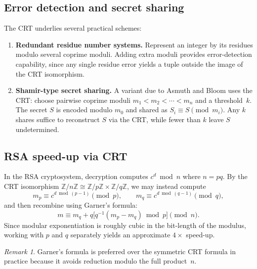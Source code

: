 \documentclass[12pt,a4paper,openany]{book}
\theoremstyle{definition}
\theoremstyle{plain}
\theoremstyle{remark}
\newtheorem{remark}[definition]{Remark}
\newcommand{\Z}{\mathbb{Z}}
\begin{document}
\subsection{Error detection and secret sharing}
\label{subsec:crt-codes}

The CRT underlies several practical schemes:

\begin{enumerate}[label=(\roman*)]
  \item \textbf{Redundant residue number systems.}
    Represent an integer by its residues modulo several coprime moduli.
    Adding extra moduli provides error-detection capability, since any single
    residue error yields a tuple outside the image of the CRT isomorphism.

  \item \textbf{Shamir-type secret sharing.}
    A variant due to Asmuth and Bloom uses the CRT:
    choose pairwise coprime moduli $m_1 < m_2 < \cdots < m_n$ and a threshold~$k$.
    The secret $S$ is encoded modulo $m_0$ and shared as $S_i \equiv S \pmod{m_i}$.
    Any $k$ shares suffice to reconstruct $S$ via the CRT, while fewer than $k$
    leave $S$ undetermined.
\end{enumerate}

\subsection{RSA speed-up via CRT}
\label{subsec:crt-rsa}

In the RSA cryptosystem, decryption computes $c^d \bmod n$ where $n = pq$.
By the CRT isomorphism $\Z/n\Z \cong \Z/p\Z \times \Z/q\Z$, we may instead compute
\[
  m_p \equiv c^{d \bmod (p-1)} \pmod{p}, \qquad
  m_q \equiv c^{d \bmod (q-1)} \pmod{q},
\]
and then recombine using Garner's formula:
\[
  m \equiv m_q + q \bigl[q^{-1}(m_p - m_q) \bmod p\bigr] \pmod{n}.
\]
Since modular exponentiation is roughly cubic in the bit-length of the modulus,
working with $p$ and $q$ separately yields an approximate $4\times$ speed-up.

\begin{remark}
\label{rem:crt-garner}
Garner's formula is preferred over the symmetric CRT formula in practice because
it avoids reduction modulo the full product~$n$.
\end{remark}
\end{document}
